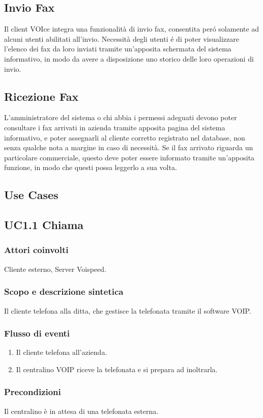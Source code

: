 \subsection{Invio Fax}
Il client VOIce integra una funzionalit\`a di invio fax, consentita per\'o solamente ad alcuni utenti abilitati all'invio. Necessit\`a degli utenti \'e di poter visualizzare l'elenco dei fax da loro inviati tramite un'apposita schermata del sistema informativo, in modo da avere a disposizione uno storico delle loro operazioni di invio.
\subsection{Ricezione Fax}
L'amministratore del sistema o chi abbia i permessi adeguati devono poter consultare i fax arrivati in azienda tramite apposita pagina del sistema informativo, e poter assegnarli al cliente corretto registrato nel database, non senza qualche nota a margine in caso di necessit\`a. Se il fax arrivato riguarda un particolare commerciale, questo deve poter essere informato tramite un'apposita funzione, in modo che questi possa leggerlo a sua volta.
\subsection{Use Cases}
\subsection*{UC1.1 Chiama}
\subsubsection*{Attori coinvolti} Cliente esterno, Server Voispeed.
\subsubsection*{Scopo e descrizione sintetica}
Il cliente telefona alla ditta, che gestisce la telefonata tramite il software VOIP.
\subsubsection*{Flusso di eventi}
\begin{enumerate}
\item Il cliente telefona all'azienda.
\item Il centralino VOIP riceve la telefonata e si prepara ad inoltrarla.
\end{enumerate}
\subsubsection*{Precondizioni}  Il centralino \` e in attesa di una telefonata esterna.
